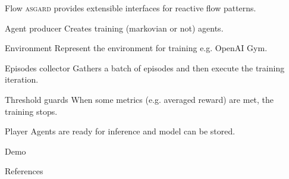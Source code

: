 \documentclass[aspectratio=169]{beamer}
\begin{document}
\begin{frame}{Flow}
	\textsc{asgard} provides extensible interfaces for reactive flow patterns.
		\begin{alertblock}{Agent producer}
			Creates training (markovian or not) agents. 
		\end{alertblock}
		\begin{alertblock}{Environment}
			Represent the environment for training e.g. OpenAI Gym.
		\end{alertblock}
		\begin{alertblock}{Episodes collector}
			Gathers a batch of episodes and then execute the training iteration.
		\end{alertblock}
		\begin{alertblock}{Threshold guards}
			When some metrics (e.g. averaged reward) are met, the training stops.
		\end{alertblock}
		\begin{alertblock}{Player}
			Agents are ready for inference and model can be stored.
		\end{alertblock}
\end{frame}

{
\begin{frame}[standout]
  Demo
\end{frame}
}
\begin{frame}[allowframebreaks]{References}

  
  

\end{frame}
\end{document}
